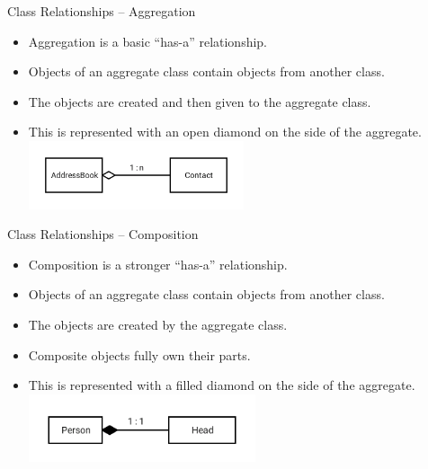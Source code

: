 \documentclass[]{beamer}
\begin{document}
\begin{frame}{Class Relationships -- Aggregation}
    \begin{itemize}[<+->]
        \item Aggregation is a basic ``has-a'' relationship.
        \item Objects of an aggregate class contain objects from
            another class.
        \item The objects are created and then given to the aggregate
            class.
        \item This is represented with an open diamond on the side of
            the aggregate.
            \newline\includegraphics[height=2cm]{images/uml-aggregate}
    \end{itemize}
\end{frame}

\begin{frame}{Class Relationships -- Composition}
    \begin{itemize}[<+->]
        \item Composition is a stronger ``has-a'' relationship.
        \item Objects of an aggregate class contain objects from
            another class.
        \item The objects are created by the aggregate class.
        \item Composite objects fully own their parts.
        \item This is represented with a filled diamond on the side of
            the aggregate.
            \newline\includegraphics[height=2cm]{images/uml-composite}
    \end{itemize}
\end{frame}
\end{document}
